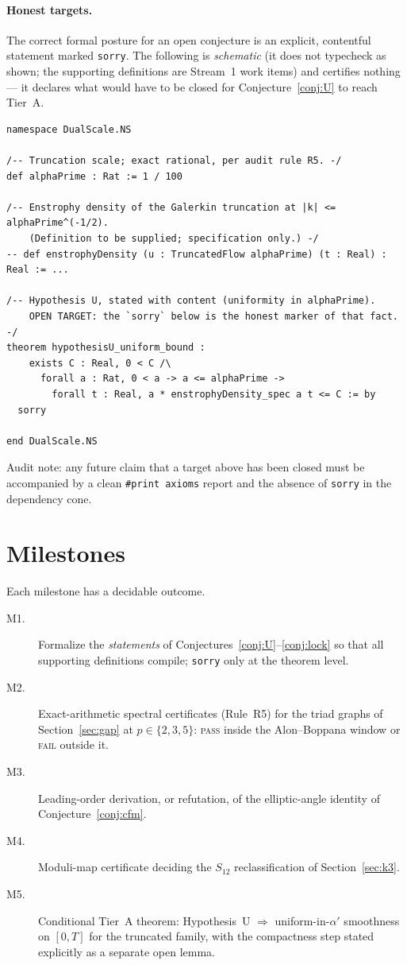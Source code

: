 \documentclass[11pt,a4paper]{article}
\theoremstyle{plain}
\theoremstyle{definition}
\theoremstyle{remark}
\begin{document}
\paragraph{Honest targets.} The correct formal posture for an open
conjecture is an explicit, contentful statement marked \texttt{sorry}. The
following is \emph{schematic} (it does not typecheck as shown; the
supporting definitions are Stream~1 work items) and certifies nothing --- it
declares what would have to be closed for Conjecture~\ref{conj:U} to reach
Tier~A.

\begin{lstlisting}[caption={Formal target (OPEN). \texttt{sorry} = unproven; this listing is a specification, not a verification.}]
namespace DualScale.NS

/-- Truncation scale; exact rational, per audit rule R5. -/
def alphaPrime : Rat := 1 / 100

/-- Enstrophy density of the Galerkin truncation at |k| <= alphaPrime^(-1/2).
    (Definition to be supplied; specification only.) -/
-- def enstrophyDensity (u : TruncatedFlow alphaPrime) (t : Real) : Real := ...

/-- Hypothesis U, stated with content (uniformity in alphaPrime).
    OPEN TARGET: the `sorry` below is the honest marker of that fact. -/
theorem hypothesisU_uniform_bound :
    exists C : Real, 0 < C /\
      forall a : Rat, 0 < a -> a <= alphaPrime ->
        forall t : Real, a * enstrophyDensity_spec a t <= C := by
  sorry

end DualScale.NS
\end{lstlisting}

\noindent Audit note: any future claim that a target above has been closed
must be accompanied by a clean \texttt{\#print axioms} report and the
absence of \texttt{sorry} in the dependency cone.

\section{Milestones}\label{sec:milestones}

Each milestone has a decidable outcome.

\begin{description}
\item[M1.] Formalize the \emph{statements} of
Conjectures~\ref{conj:U}--\ref{conj:lock} so that all supporting definitions
compile; \texttt{sorry} only at the theorem level.
\item[M2.] Exact-arithmetic spectral certificates (Rule~R5) for the triad
graphs of Section~\ref{sec:gap} at $p\in\{2,3,5\}$: \textsc{pass} inside the
Alon--Boppana window or \textsc{fail} outside it.
\item[M3.] Leading-order derivation, or refutation, of the elliptic-angle
identity of Conjecture~\ref{conj:cfm}.
\item[M4.] Moduli-map certificate deciding the $S_{12}$ reclassification of
Section~\ref{sec:k3}.
\item[M5.] Conditional Tier~A theorem: Hypothesis~U $\Rightarrow$
uniform-in-$\alpha'$ smoothness on $[0,T]$ for the truncated family, with
the compactness step stated explicitly as a separate open lemma.
\end{description}
\end{document}
